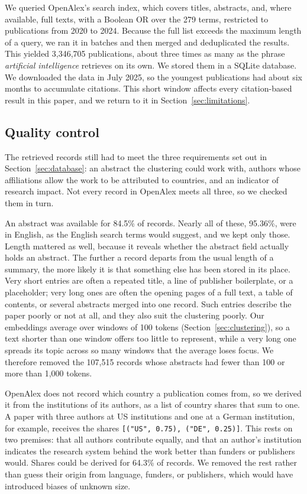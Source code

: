 \documentclass[10pt,twocolumn,a4paper]{article}
\begin{document}
	We queried OpenAlex's search index, which covers titles, abstracts, and, where available, full texts, with a Boolean OR over the 279 terms, restricted to publications from 2020 to 2024. Because the full list exceeds the maximum length of a query, we ran it in batches and then merged and deduplicated the results. This yielded 3,346,705 publications, about three times as many as the phrase \textit{artificial intelligence} retrieves on its own. We stored them in a SQLite database. We downloaded the data in July 2025, so the youngest publications had about six months to accumulate citations. This short window affects every citation-based result in this paper, and we return to it in Section~\ref{sec:limitations}.
	
	\subsection{Quality control}
	\label{sec:quality}
	
	The retrieved records still had to meet the three requirements set out in Section~\ref{sec:database}: an abstract the clustering could work with, authors whose affiliations allow the work to be attributed to countries, and an indicator of research impact. Not every record in OpenAlex meets all three, so we checked them in turn.
	
	An abstract was available for 84.5\% of records. Nearly all of these, 95.36\%, were in English, as the English search terms would suggest, and we kept only those. Length mattered as well, because it reveals whether the abstract field actually holds an abstract. The further a record departs from the usual length of a summary, the more likely it is that something else has been stored in its place. Very short entries are often a repeated title, a line of publisher boilerplate, or a placeholder; very long ones are often the opening pages of a full text, a table of contents, or several abstracts merged into one record. Such entries describe the paper poorly or not at all, and they also suit the clustering poorly. Our embeddings average over windows of 100 tokens (Section~\ref{sec:clustering}), so a text shorter than one window offers too little to represent, while a very long one spreads its topic across so many windows that the average loses focus. We therefore removed the 107,515 records whose abstracts had fewer than 100 or more than 1,000 tokens.
	
	OpenAlex does not record which country a publication comes from, so we derived it from the institutions of its authors, as a list of country shares that sum to one. A paper with three authors at US institutions and one at a German institution, for example, receives the shares \texttt{[("US", 0.75), ("DE", 0.25)]}. This rests on two premises: that all authors contribute equally, and that an author's institution indicates the research system behind the work better than funders or publishers would. Shares could be derived for 64.3\% of records. We removed the rest rather than guess their origin from language, funders, or publishers, which would have introduced biases of unknown size.
	
\end{document}
